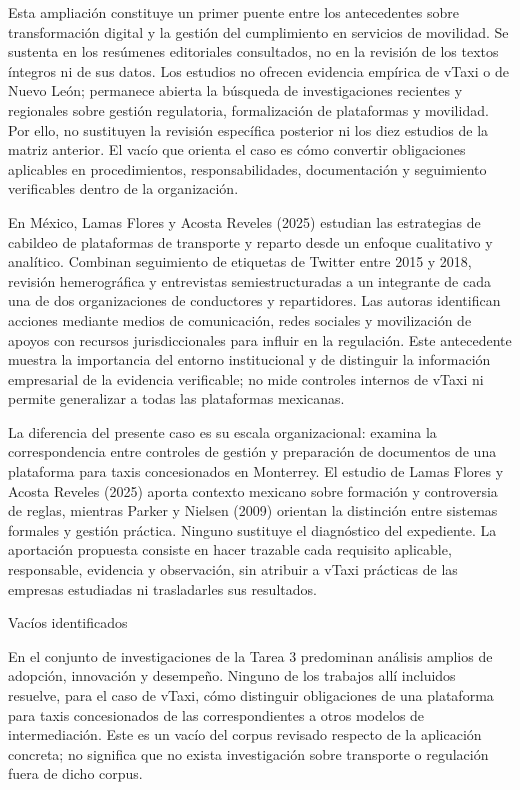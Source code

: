 {Esta ampliación constituye un primer puente entre los antecedentes sobre transformación digital y la gestión del cumplimiento en servicios de movilidad. Se sustenta en los resúmenes editoriales consultados, no en la revisión de los textos íntegros ni de sus datos. Los estudios no ofrecen evidencia empírica de vTaxi o de Nuevo León; permanece abierta la búsqueda de investigaciones recientes y regionales sobre gestión regulatoria, formalización de plataformas y movilidad. Por ello, no sustituyen la revisión específica posterior ni los diez estudios de la matriz anterior. El vacío que orienta el caso es cómo convertir obligaciones aplicables en procedimientos, responsabilidades, documentación y seguimiento verificables dentro de la organización.


En México, Lamas Flores y Acosta Reveles (2025) estudian las estrategias de cabildeo de plataformas de transporte y reparto desde un enfoque cualitativo y analítico. Combinan seguimiento de etiquetas de Twitter entre 2015 y 2018, revisión hemerográfica y entrevistas semiestructuradas a un integrante de cada una de dos organizaciones de conductores y repartidores. Las autoras identifican acciones mediante medios de comunicación, redes sociales y movilización de apoyos con recursos jurisdiccionales para influir en la regulación. Este antecedente muestra la importancia del entorno institucional y de distinguir la información empresarial de la evidencia verificable; no mide controles internos de vTaxi ni permite generalizar a todas las plataformas mexicanas.


La diferencia del presente caso es su escala organizacional: examina la correspondencia entre controles de gestión y preparación de documentos de una plataforma para taxis concesionados en Monterrey. El estudio de Lamas Flores y Acosta Reveles (2025) aporta contexto mexicano sobre formación y controversia de reglas, mientras Parker y Nielsen (2009) orientan la distinción entre sistemas formales y gestión práctica. Ninguno sustituye el diagnóstico del expediente. La aportación propuesta consiste en hacer trazable cada requisito aplicable, responsable, evidencia y observación, sin atribuir a vTaxi prácticas de las empresas estudiadas ni trasladarles sus resultados.


Vacíos identificados


En el conjunto de investigaciones de la Tarea 3 predominan análisis amplios de adopción, innovación y desempeño. Ninguno de los trabajos allí incluidos resuelve, para el caso de vTaxi, cómo distinguir obligaciones de una plataforma para taxis concesionados de las correspondientes a otros modelos de intermediación. Este es un vacío del corpus revisado respecto de la aplicación concreta; no significa que no exista investigación sobre transporte o regulación fuera de dicho corpus.


}
